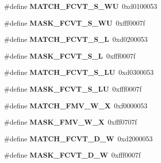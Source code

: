 \begin{DoxyCompactItemize}
\item 
\mbox{\label{riscv-utility_8h_aeb85684cc0f051b8517eaf066a52881b}} 
\#define {\bfseries M\+A\+T\+C\+H\+\_\+\+F\+C\+V\+T\+\_\+\+S\+\_\+\+WU}~0xd0100053
\item 
\mbox{\label{riscv-utility_8h_abc64b368e6cced46812df498f9f874e7}} 
\#define {\bfseries M\+A\+S\+K\+\_\+\+F\+C\+V\+T\+\_\+\+S\+\_\+\+WU}~0xfff0007f
\item 
\mbox{\label{riscv-utility_8h_a349288108b74239ae163bc713deec62f}} 
\#define {\bfseries M\+A\+T\+C\+H\+\_\+\+F\+C\+V\+T\+\_\+\+S\+\_\+L}~0xd0200053
\item 
\mbox{\label{riscv-utility_8h_a1d46456f83f7f46505dc9fc3db3f4ab8}} 
\#define {\bfseries M\+A\+S\+K\+\_\+\+F\+C\+V\+T\+\_\+\+S\+\_\+L}~0xfff0007f
\item 
\mbox{\label{riscv-utility_8h_a4b234d1dd8797b034cbd438e0c39736e}} 
\#define {\bfseries M\+A\+T\+C\+H\+\_\+\+F\+C\+V\+T\+\_\+\+S\+\_\+\+LU}~0xd0300053
\item 
\mbox{\label{riscv-utility_8h_a1fbd53923f442ab5a66299ac7b9b9894}} 
\#define {\bfseries M\+A\+S\+K\+\_\+\+F\+C\+V\+T\+\_\+\+S\+\_\+\+LU}~0xfff0007f
\item 
\mbox{\label{riscv-utility_8h_a7610dba91e9c5b4ebaa43e7c893b2eae}} 
\#define {\bfseries M\+A\+T\+C\+H\+\_\+\+F\+M\+V\+\_\+\+W\+\_\+X}~0xf0000053
\item 
\mbox{\label{riscv-utility_8h_a2ea7a3e7d357343d9b3b579c345e4245}} 
\#define {\bfseries M\+A\+S\+K\+\_\+\+F\+M\+V\+\_\+\+W\+\_\+X}~0xfff0707f
\item 
\mbox{\label{riscv-utility_8h_a1f306c23d2ef60d5c003156224d7701a}} 
\#define {\bfseries M\+A\+T\+C\+H\+\_\+\+F\+C\+V\+T\+\_\+\+D\+\_\+W}~0xd2000053
\item 
\mbox{\label{riscv-utility_8h_a8322f6cad4026832a34da75f00a254f3}} 
\#define {\bfseries M\+A\+S\+K\+\_\+\+F\+C\+V\+T\+\_\+\+D\+\_\+W}~0xfff0007f
\item 

\end{DoxyCompactItemize}

